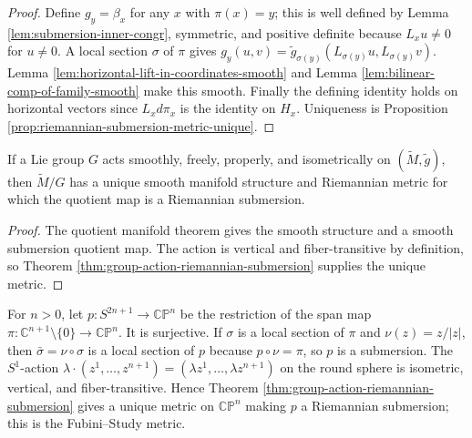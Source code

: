 \begin{proof}

\sketch Define $g_y=\beta_x$ for any $x$ with $\pi(x)=y$; this is well defined by Lemma \ref{lem:submersion-inner-congr}, symmetric, and positive definite because $L_xu\ne0$ for $u\ne0$. A local section $\sigma$ of $\pi$ gives $g_y(u,v)=\tilde g_{\sigma(y)}(L_{\sigma(y)}u,L_{\sigma(y)}v)$. Lemma \ref{lem:horizontal-lift-in-coordinates-smooth} and Lemma \ref{lem:bilinear-comp-of-family-smooth} make this smooth. Finally the defining identity holds on horizontal vectors since $L_xd\pi_x$ is the identity on $H_x$. Uniqueness is Proposition \ref{prop:riemannian-submersion-metric-unique}.
\end{proof}

\begin{corollary}
\label{cor:quotient-manifold-lie-group-riemannian-metric}

If a Lie group $G$ acts smoothly, freely, properly, and isometrically on $(\tilde M,\tilde g)$, then $\tilde M/G$ has a unique smooth manifold structure and Riemannian metric for which the quotient map is a Riemannian submersion.
\end{corollary}

\begin{proof}
\sketch The quotient manifold theorem gives the smooth structure and a smooth submersion quotient map. The action is vertical and fiber-transitive by definition, so Theorem \ref{thm:group-action-riemannian-submersion} supplies the unique metric.
\end{proof}

\begin{example}
\label{ex:fubini-study-metric}

For $n>0$, let $p:S^{2n+1}\to\mathbb{CP}^n$ be the restriction of the span map $\pi:\mathbb C^{n+1}\setminus\{0\}\to\mathbb{CP}^n$. It is surjective. If $\sigma$ is a local section of $\pi$ and $\nu(z)=z/|z|$, then $\bar\sigma=\nu\circ\sigma$ is a local section of $p$ because $p\circ\nu=\pi$, so $p$ is a submersion. The $S^1$-action $\lambda\cdot(z^1,\ldots,z^{n+1})=(\lambda z^1,\ldots,\lambda z^{n+1})$ on the round sphere is isometric, vertical, and fiber-transitive. Hence Theorem \ref{thm:group-action-riemannian-submersion} gives a unique metric on $\mathbb{CP}^n$ making $p$ a Riemannian submersion; this is the Fubini--Study metric.
\end{example}

